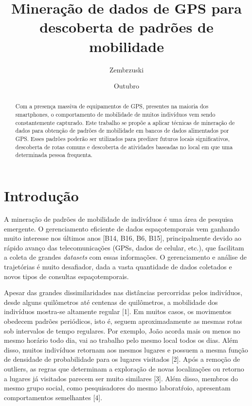 \documentclass[ppgc,pep]{iiufrgs}
\title{Mineração de dados de GPS para descoberta de padrões de mobilidade}
\author{Zembrzuski}{Rodrigo Claro}
\date{Outubro}{2017}
\begin{document}
\makeatletter
\let\@makenominatapage\relax
\makeatother
\maketitle

\begin{abstract}
Com a presença massiva de equipamentos de GPS, presentes na maioria dos smartphones, o comportamento 
de mobilidade de muitos indivíduos vem sendo constantemente capturado. Este trabalho 
se propõe a aplicar técnicas de mineração de dados para obtenção de padrões de mobilidade em 
bancos de dados alimentados por GPS. Esses padrões poderão ser utilizados para predizer futuros
locais significativos, descoberta de rotas comuns e descoberta de atividades baseadas no local
em que uma determinada pessoa frequenta.
\end{abstract}

\chapter{Introdução}

A mineração de padrões de mobilidade de indivíduos é uma
área de pesquisa emergente. O gerenciamento eficiente
de dados espaçotemporais vem ganhando muito interesse nos
últimos anos [B14, B16, B6, B15], principalmente devido
ao rápido avanço das telecomunicações (GPSs, dados de
celular, etc.), que facilitam a coleta de grandes {\it datasets}
com essas informações. O gerenciamento e análise de trajetórias
é muito desafiador, dada a vasta quantidade de dados
coletados e novos tipos de consultas espaçotemporais.

Apesar das grandes dissimilaridades nas distâncias percorridas
pelos indivíduos, desde alguns quilômetros até centenas
de quilômetros, a mobilidade dos indivíduos mostra-se altamente
regular [1]. Em muitos casos, os movimentos obedecem padrões
periódicos, isto é, seguem aproximadamente as mesmas rotas
sob intervalos de tempo regulares. Por exemplo, João acorda
mais ou menos no mesmo horário todo dia, vai ao trabalho
pelo mesmo local todos os dias. Além disso, muitos indivíduos 
retornam aos mesmos lugares e
possuem a mesma função de densidade de probabilidade para
os lugares visitados [2]. Após a remoção de outliers, as regras
que determinam a exploração de novas localizações ou retorno a 
lugares já visitados parecem ser muito similares [3]. Além disso,
membros do mesmo grupo social, como pesquisadores do mesmo 
laboratŕoio, apresentam comportamentos semelhantes [4].
\end{document}
